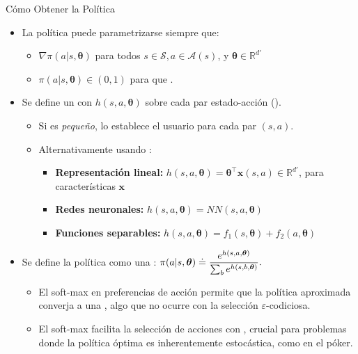 \documentclass[10pt, envcountsect, handout, aspectratio=1610, hyperref={hypertexnames=true}]{beamer}
\begin{document}
\begin{frame}{Cómo Obtener la Política}
	
	\begin{itemize}
		\item La política puede parametrizarse siempre que:
			\begin{itemize}
				\item  $\nabla \pi(a|s, \bm{\theta})$  para todos $s \in \mathcal{S}, a \in \mathcal{A}(s)$, y $\bm{\theta} \in \mathbb{R}^{d'}$
				\item $\pi(a|s, \bm{\theta}) \in (0, 1)$ para que .
			\end{itemize}
		\item Se define un  con $h(s,a,\bm{\theta})$ sobre cada par estado-acción ().
			\begin{itemize}
				\item Si es \textit{pequeño}, lo establece el usuario para cada par $(s,a)$.
				\item Alternativamente usando :
					\begin{itemize}
						\item \textbf{Representación lineal:} $ h(s,a,\bm{\theta}) = \bm{\theta}^\top \mathbf{x}(s, a) \in\mathbb{R}^{d'}$, para características $\mathbf{x}$
						\item \textbf{Redes neuronales:}  $ h(s,a,\bm{\theta}) = NN(s, a, \bm{\theta})$
						\item \textbf{Funciones separables: } $ h(s,a,\bm{\theta}) =  f_1(s,\bm{\theta}) +  f_2(a,\bm{\theta})$
					\end{itemize}
			\end{itemize}
			
		\item Se define la política como una : $\displaystyle \pi(a|s, \bm{\theta}) \doteq \frac{e^{h(s,a,\bm{\theta})}}{\sum_b e^{h(s,b,\bm{\theta})}}. $
		
		\begin{itemize}
			\item El soft-max en preferencias de acción permite que la política aproximada converja a una , algo que no ocurre con la selección $\varepsilon$-codiciosa.

			\item El soft-max facilita la selección de acciones con , crucial para problemas donde la política óptima es inherentemente estocástica, como en el póker. 
			

\end{itemize}
\end{itemize}
\end{frame}
\end{document}
